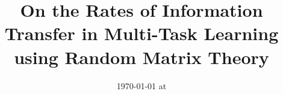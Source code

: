 \documentclass{article}
\begin{document}
\title{On the Rates of Information Transfer in Multi-Task Learning using Random Matrix Theory}
\date{}
\maketitle
\date{{\ddmmyyyydate\today} at \currenttime}






	
	
\end{document}
